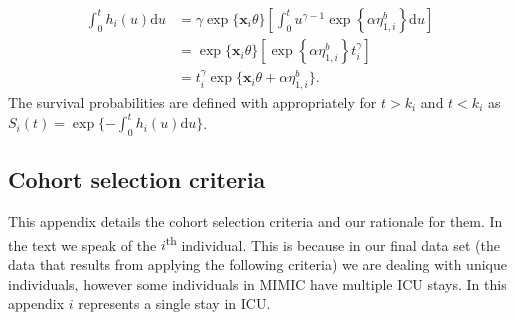 \documentclass[
  10pt,
  a4paper,
]{article}
\begin{document}
\begin{align*}
  \int_{0}^{t} h_{i}(u) \text{d}u
  &= \gamma \exp\{\boldsymbol{x}_{i}\theta\}
    \left[
      \int_{0}^{t}
        u^{\gamma - 1}
        \exp\left\{
          \alpha \eta^{b}_{1, i}
        \right\}
      \text{d}u
    \right] \\
  &= \exp\{\boldsymbol{x}_{i}\theta\}
    \left[
      \exp\left\{
        \alpha \eta^{b}_{1, i}
      \right\}
      t_{i}^{\gamma}
    \right] \\
  &= t_{i}^{\gamma} \exp\{\boldsymbol{x}_{i}\theta + \alpha \eta^{b}_{1, i}\}.
\end{align*} The survival probabilities are defined with appropriately
for \(t > k_{i}\) and \(t < k_{i}\) as
\(S_{i}(t) = \exp\{-\int_{0}^{t} h_{i}(u) \text{d}u\}\).

\hypertarget{cohort-selection-criteria}{%
\subsection{Cohort selection criteria}\label{cohort-selection-criteria}}

This appendix details the cohort selection criteria and our rationale
for them. In the text we speak of the \(i\)\textsuperscript{th}
individual. This is because in our final data set (the data that results
from applying the following criteria) we are dealing with unique
individuals, however some individuals in MIMIC have multiple ICU stays.
In this appendix \(i\) represents a single stay in ICU.
\end{document}
